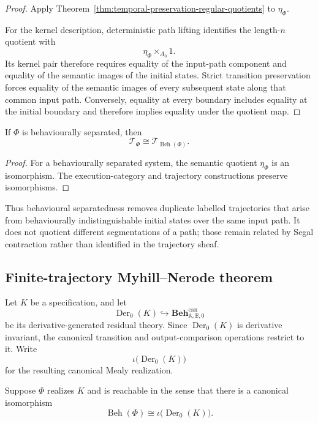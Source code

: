 \begin{proof}
Apply
Theorem~\ref{thm:temporal-preservation-regular-quotients}
to \(\eta_\Phi\).

For the kernel description, deterministic path lifting identifies the
length-\(n\) quotient with
\[
    \eta_\Phi\times_{A_0}1.
\]
Its kernel pair therefore requires equality of the input-path component and
equality of the semantic images of the initial states. Strict transition
preservation forces equality of the semantic images of every subsequent state
along that common input path. Conversely, equality at every boundary includes
equality at the initial boundary and therefore implies equality under the
quotient map.
\end{proof}

\begin{corollary}
\label{cor:separated-temporal-semantics}
If \(\Phi\) is behaviourally separated, then
\[
    \mathscr T_\Phi
    \cong
    \mathscr T_{\operatorname{Beh}(\Phi)}.
\]
\end{corollary}

\begin{proof}
For a behaviourally separated system, the semantic quotient \(\eta_\Phi\) is
an isomorphism. The execution-category and trajectory constructions preserve
isomorphisms.
\end{proof}

Thus behavioural separatedness removes duplicate labelled trajectories that
arise from behaviourally indistinguishable initial states over the same input
path. It does not quotient different segmentations of a path; those remain
related by Segal contraction rather than identified in the trajectory sheaf.

\subsection{Finite-trajectory Myhill--Nerode theorem}
\label{subsec:temporal-myhill-nerode}

Let \(K\) be a specification, and let
\[
    \operatorname{Der}_0(K)
    \hookrightarrow
    \mathbf{Beh}^{\mathrm{can}}_{\mathbb A,\mathbb B,0}
\]
be its derivative-generated residual theory. Since
\(\operatorname{Der}_0(K)\) is derivative invariant, the canonical
transition and output-comparison operations restrict to it. Write
\[
    \iota\bigl(\operatorname{Der}_0(K)\bigr)
\]
for the resulting canonical Mealy realization.

Suppose \(\Phi\) realizes \(K\) and is reachable in the sense that there is a
canonical isomorphism
\[
    \operatorname{Beh}(\Phi)
    \cong
    \iota\bigl(\operatorname{Der}_0(K)\bigr).
\]

